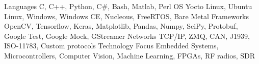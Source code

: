 

\begin{cvskills}

  \cvskill
    {Languages} %
    {C, C++, Python, C\#, Bash, Matlab, Perl} %
  \cvskill
    {OS} %
    {Yocto Linux, Ubuntu Linux, Windows, Windows CE, Nucleous, FreeRTOS, Bare Metal} %
  \cvskill
    {Frameworks} %
    {OpenCV, Tensorflow, Keras, Matplotlib, Pandas, Numpy, SciPy, Protobuf, Google Test, Google Mock, GStreamer} %
  \cvskill
    {Networks} %
    {TCP/IP, ZMQ, CAN, J1939, ISO-11783, Custom protocols} %
  \cvskill
    {Technology Focus} %
    {Embedded Systems, Microcontrollers, Computer Vision, Machine Learning, FPGAs, RF radios, SDR} %

\end{cvskills}

